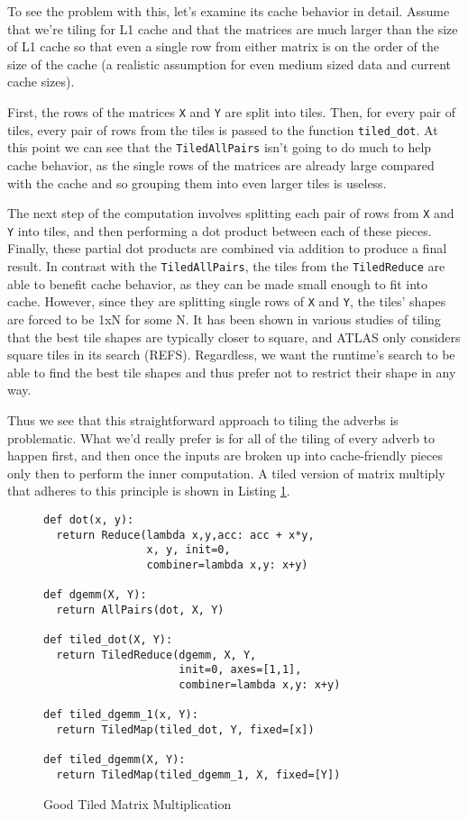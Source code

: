 To see the problem with this, let's examine its cache behavior in detail.  Assume that we're tiling for L1 cache and that the matrices are much larger than the size of L1 cache so that even a single row from either matrix is on the order of the size of the cache (a realistic assumption for even medium sized data and current cache sizes).

First, the rows of the matrices \lstinline{X} and \lstinline{Y} are split into tiles.  Then, for every pair of tiles, every pair of rows from the tiles is passed to the function \lstinline{tiled_dot}.  At this point we can see that the \lstinline{TiledAllPairs} isn't going to do much to help cache behavior, as the single rows of the matrices are already large compared with the cache and so grouping them into even larger tiles is useless.

The next step of the computation involves splitting each pair of rows from \lstinline{X} and \lstinline{Y} into tiles, and then performing a dot product between each of these pieces.  Finally, these partial dot products are combined via addition to produce a final result.  In contrast with the \lstinline{TiledAllPairs}, the tiles from the \lstinline{TiledReduce} are able to benefit cache behavior, as they can be made small enough to fit into cache.  However, since they are splitting single rows of \lstinline{X} and \lstinline{Y}, the tiles' shapes are forced to be 1xN for some N.  It has been shown in various studies of tiling that the best tile shapes are typically closer to square, and ATLAS only considers square tiles in its search (REFS).  Regardless, we want the runtime's search to be able to find the best tile shapes and thus prefer not to restrict their shape in any way.

Thus we see that this straightforward approach to tiling the adverbs is problematic.  What we'd really prefer is for all of the tiling of every adverb to happen first, and then once the inputs are broken up into cache-friendly pieces only then to perform the inner computation.  A tiled version of matrix multiply that adheres to this principle is shown in Listing \ref{good_tiled_adverb_mm}.

\begin{figure}
\begin{singlespace}
\begin{lstlisting}
def dot(x, y):
  return Reduce(lambda x,y,acc: acc + x*y,
                x, y, init=0,
                combiner=lambda x,y: x+y)

def dgemm(X, Y):
  return AllPairs(dot, X, Y)

def tiled_dot(X, Y):
  return TiledReduce(dgemm, X, Y,
                     init=0, axes=[1,1],
                     combiner=lambda x,y: x+y)

def tiled_dgemm_1(x, Y):
  return TiledMap(tiled_dot, Y, fixed=[x])
                     
def tiled_dgemm(X, Y):
  return TiledMap(tiled_dgemm_1, X, fixed=[Y])
\end{lstlisting}
\end{singlespace}
\label{good_tiled_adverb_mm}
\caption{Good Tiled Matrix Multiplication}
\end{figure}

